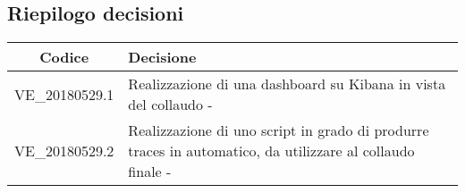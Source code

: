 	\subsection{Riepilogo decisioni}
		\begin{center}
		    \begin{tabular}{c | p{12cm}}
		        \centering
		        \rowcolor[gray]{.9} { \textbf{Codice} } & { \textbf{Decisione} } \\ 
        		\hline
		        \rowcolor[gray]{.8} VE\_20180529.1 & 
		        	Realizzazione di una dashboard su Kibana in vista del collaudo - \Tommaso \\
		        \rowcolor[gray]{.9} VE\_20180529.2 & 
		        	Realizzazione di uno script in grado di produrre traces in automatico, da utilizzare
		        	al collaudo finale - \Mattia \\
		    \end{tabular}
		\end{center}
